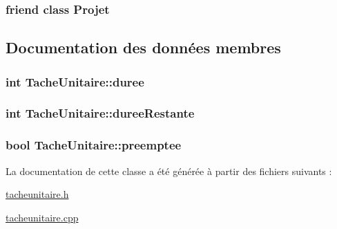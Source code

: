 \subsubsection[{Projet}]{\setlength{\rightskip}{0pt plus 5cm}friend class {\bf Projet}\hspace{0.3cm}{\ttfamily [friend]}}\label{class_tache_unitaire_ab87b41c3faa36955cc370972f5cce344}


\subsection{Documentation des données membres}
\hypertarget{class_tache_unitaire_a5510c1941069a4391e076ec45e0201fc}{}
\subsubsection[{duree}]{\setlength{\rightskip}{0pt plus 5cm}int Tache\+Unitaire\+::duree\hspace{0.3cm}{\ttfamily [private]}}\label{class_tache_unitaire_a5510c1941069a4391e076ec45e0201fc}
\hypertarget{class_tache_unitaire_a73dd33a7047739e49c80373aeae3158e}{}
\subsubsection[{duree\+Restante}]{\setlength{\rightskip}{0pt plus 5cm}int Tache\+Unitaire\+::duree\+Restante\hspace{0.3cm}{\ttfamily [private]}}\label{class_tache_unitaire_a73dd33a7047739e49c80373aeae3158e}
\hypertarget{class_tache_unitaire_a21bc1074f99a80976a52d910e3c21041}{}
\subsubsection[{preemptee}]{\setlength{\rightskip}{0pt plus 5cm}bool Tache\+Unitaire\+::preemptee\hspace{0.3cm}{\ttfamily [private]}}\label{class_tache_unitaire_a21bc1074f99a80976a52d910e3c21041}


La documentation de cette classe a été générée à partir des fichiers suivants \+:\begin{DoxyCompactItemize}
\item 
\hyperlink{tacheunitaire_8h}{tacheunitaire.\+h}\item 
\hyperlink{tacheunitaire_8cpp}{tacheunitaire.\+cpp}\end{DoxyCompactItemize}
